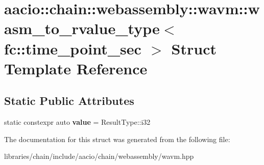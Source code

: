 \hypertarget{structaacio_1_1chain_1_1webassembly_1_1wavm_1_1wasm__to__rvalue__type_3_01fc_1_1time__point__sec_01_4}{}\section{aacio\+:\+:chain\+:\+:webassembly\+:\+:wavm\+:\+:wasm\+\_\+to\+\_\+rvalue\+\_\+type$<$ fc\+:\+:time\+\_\+point\+\_\+sec $>$ Struct Template Reference}
\label{structaacio_1_1chain_1_1webassembly_1_1wavm_1_1wasm__to__rvalue__type_3_01fc_1_1time__point__sec_01_4}
\subsection*{Static Public Attributes}
\begin{DoxyCompactItemize}
\item 
\mbox{\label{structaacio_1_1chain_1_1webassembly_1_1wavm_1_1wasm__to__rvalue__type_3_01fc_1_1time__point__sec_01_4_ae22c7a378e49cda0ca363f5975c3da25}} 
static constexpr auto {\bfseries value} = Result\+Type\+::i32
\end{DoxyCompactItemize}


The documentation for this struct was generated from the following file\+:\begin{DoxyCompactItemize}
\item 
libraries/chain/include/aacio/chain/webassembly/wavm.\+hpp\end{DoxyCompactItemize}

